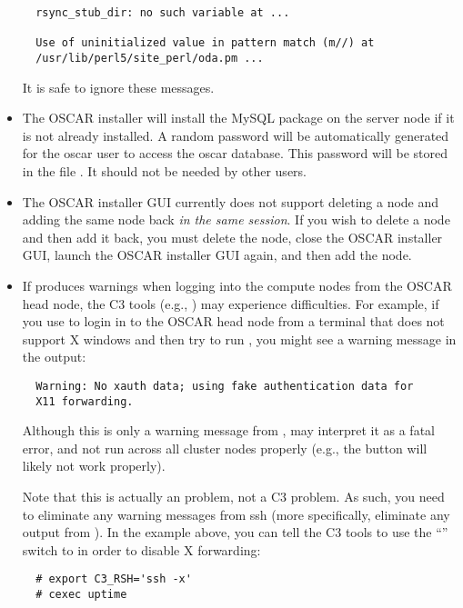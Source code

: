 \begin{itemize}
\begin{verbatim}
  rsync_stub_dir: no such variable at ...

  Use of uninitialized value in pattern match (m//) at
  /usr/lib/perl5/site_perl/oda.pm ...
\end{verbatim}

  It is safe to ignore these messages.

\item The OSCAR installer will install the MySQL package on the server
  node if it is not already installed.  A random password will be automatically
  generated for the oscar user to access the oscar database.  This
  password will be stored in the file .  It should
  not be needed by other users.

\item The OSCAR installer GUI currently does not support deleting a
  node and adding the same node back {\em in the same session}.  If
  you wish to delete a node and then add it back, you must delete the
  node, close the OSCAR installer GUI, launch the OSCAR installer GUI
  again, and then add the node.

\item If  produces warnings when logging into the compute
  nodes from the OSCAR head node, the C3 tools (e.g., ) may
  experience difficulties.  For example, if you use  to login
  in to the OSCAR head node from a terminal that does not support X
  windows and then try to run , you might see a warning
  message in the  output:

\begin{verbatim}
  Warning: No xauth data; using fake authentication data for
  X11 forwarding.
\end{verbatim}

  Although this is only a warning message from , 
  may interpret it as a fatal error, and not run across all cluster
  nodes properly (e.g., the  button
  will likely not work properly).

  Note that this is actually an  problem, not a C3 problem.
  As such, you need to eliminate any warning messages from ssh (more
  specifically, eliminate any output from ).  In the
  example above, you can tell the C3 tools to use the ``''
  switch to  in order to disable X forwarding:

\begin{verbatim}
  # export C3_RSH='ssh -x'
  # cexec uptime
\end{verbatim}


\end{itemize}
